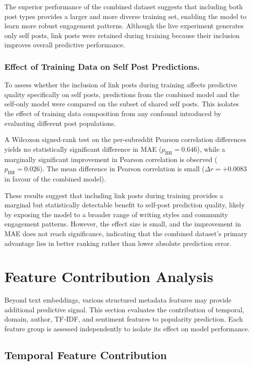 The superior performance of the combined dataset suggests that including both post types provides a larger and more diverse training set, enabling the model to learn more robust engagement patterns. Although the live experiment generates only self posts, link posts were retained during training because their inclusion improves overall predictive performance.

\subsubsection*{Effect of Training Data on Self Post Predictions.}

To assess whether the inclusion of link posts during training affects predictive quality specifically on self posts, predictions from the combined model and the self-only model were compared on the subset of shared self posts. This isolates the effect of training data composition from any confound introduced by evaluating different post populations.

A Wilcoxon signed-rank test on the per-subreddit Pearson correlation differences yields no statistically significant difference in MAE ($p_\text{BH} = 0.646$), while a marginally significant improvement in Pearson correlation is observed ($p_\text{BH} = 0.026$). The mean difference in Pearson correlation is small ($\Delta r = +0.0083$ in favour of the combined model).

These results suggest that including link posts during training provides a marginal but statistically detectable benefit to self-post prediction quality, likely by exposing the model to a broader range of writing styles and community engagement patterns. However, the effect size is small, and the improvement in MAE does not reach significance, indicating that the combined dataset's primary advantage lies in better ranking rather than lower absolute prediction error.

\section{Feature Contribution Analysis}

Beyond text embeddings, various structured metadata features may provide additional predictive signal. This section evaluates the contribution of temporal, domain, author, TF-IDF, and sentiment features to popularity prediction. Each feature group is assessed independently to isolate its effect on model performance.

\subsection{Temporal Feature Contribution}

